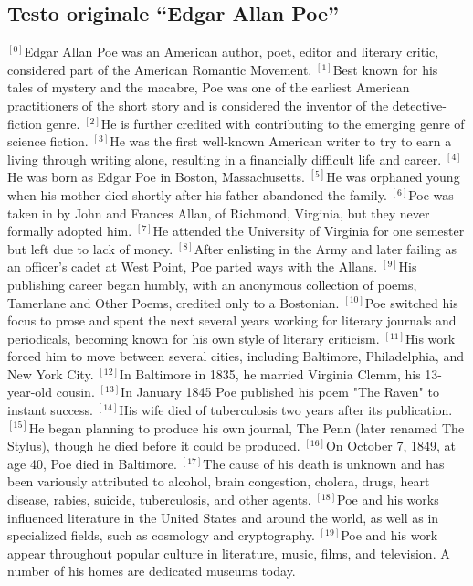 \begin{small}
\subsection*{Testo originale ``Edgar Allan Poe''}
{$^{[0]}$}Edgar Allan Poe was an American author, poet, editor and literary critic, considered part of the American Romantic Movement. 
{$^{[1]}$}Best known for his tales of mystery and the macabre, Poe was one of the earliest American practitioners of the short story and is considered the inventor of the detective-fiction genre. 
{$^{[2]}$}He is further credited with contributing to the emerging genre of science fiction. 
{$^{[3]}$}He was the first well-known American writer to try to earn a living through writing alone, resulting in a financially difficult life and career.
{$^{[4]}$}He was born as Edgar Poe in Boston, Massachusetts. 
{$^{[5]}$}He was orphaned young when his mother died shortly after his father abandoned the family. 
{$^{[6]}$}Poe was taken in by John and Frances Allan, of Richmond, Virginia, but they never formally adopted him. 
{$^{[7]}$}He attended the University of Virginia for one semester but left due to lack of money. 
{$^{[8]}$}After enlisting in the Army and later failing as an officer's cadet at West Point, Poe parted ways with the Allans. 
{$^{[9]}$}His publishing career began humbly, with an anonymous collection of poems, Tamerlane and Other Poems, credited only to a Bostonian.
{$^{[10]}$}Poe switched his focus to prose and spent the next several years working for literary journals and periodicals, becoming known for his own style of literary criticism. 
{$^{[11]}$}His work forced him to move between several cities, including Baltimore, Philadelphia, and New York City. 
{$^{[12]}$}In Baltimore in 1835, he married Virginia Clemm, his 13-year-old cousin. 
{$^{[13]}$}In January 1845 Poe published his poem "The Raven" to instant success. 
{$^{[14]}$}His wife died of tuberculosis two years after its publication. 
{$^{[15]}$}He began planning to produce his own journal, The Penn (later renamed The Stylus), though he died before it could be produced. 
{$^{[16]}$}On October 7, 1849, at age 40, Poe died in Baltimore. 
{$^{[17]}$}The cause of his death is unknown and has been variously attributed to alcohol, brain congestion, cholera, drugs, heart disease, rabies, suicide, tuberculosis, and other agents.
{$^{[18]}$}Poe and his works influenced literature in the United States and around the world, as well as in specialized fields, such as cosmology and cryptography. 
{$^{[19]}$}Poe and his work appear throughout popular culture in literature, music, films, and television. A number of his homes are dedicated museums today.
\vfill
\end{small}

